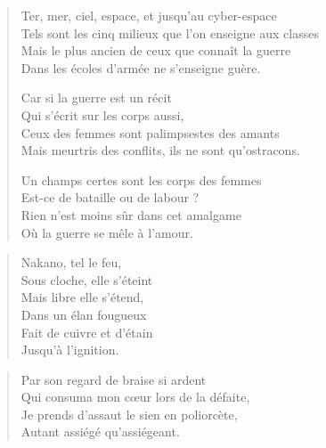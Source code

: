 \begin{verse}%
  \quatrain%
  Ter, mer, ciel, espace, et jusqu’au cyber-espace\\  %
  Tels sont les cinq milieux que l’on enseigne aux classes\\  %
  Mais le plus ancien de ceux que connaît la guerre\\  %
  Dans les écoles d’armée ne s’enseigne guère.

  Car si la guerre est un récit\\  %
  Qui s’écrit sur les corps aussi,\\  %
  Ceux des femmes sont palimpsestes des amants\\  %
  Mais meurtris des conflits, ils ne sont qu’ostracons.

  Un champs certes sont les corps des femmes\\  %
  Est-ce de bataille ou de labour ?\\  %
  Rien n’est moins sûr dans cet amalgame\\  %
  Où la guerre se mêle à l’amour.
\end{verse}


\begin{verse}%
  \sizain%
  Nakano, tel le feu,\\  %
  Sous cloche, elle s’éteint\\  %
  Mais libre elle s’étend,\\  %
  Dans un élan fougueux\\  %
  Fait de cuivre et d’étain\\  %
  Jusqu’à l’ignition.
\end{verse}

\begin{verse}%
  \quatrain%
  Par son regard de braise si ardent\\  %
  Qui consuma mon cœur lors de la défaite,\\  %
  Je prends d’assaut le sien en poliorcète,\\  %
  Autant assiégé qu’assiégeant.
\end{verse}

